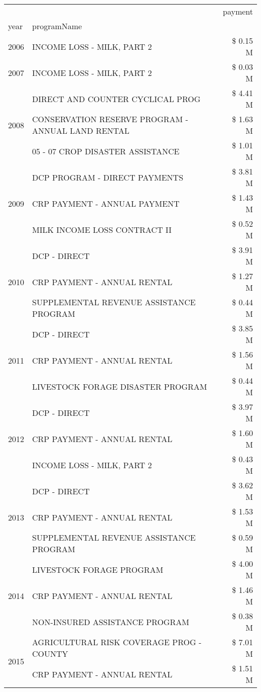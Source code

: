 \begin{tabular}{llr}
\toprule
 &  & payment \\
year & programName &  \\
\midrule
2006 & INCOME LOSS - MILK, PART 2 & \$ 0.15 M \\
\cline{1-3}
2007 & INCOME LOSS - MILK, PART 2 & \$ 0.03 M \\
\cline{1-3}
\multirow[t]{3}{*}{2008} & DIRECT AND COUNTER CYCLICAL PROG & \$ 4.41 M \\
 & CONSERVATION RESERVE PROGRAM - ANNUAL LAND RENTAL & \$ 1.63 M \\
 & 05 - 07 CROP DISASTER ASSISTANCE & \$ 1.01 M \\
\cline{1-3}
\multirow[t]{3}{*}{2009} & DCP PROGRAM - DIRECT PAYMENTS & \$ 3.81 M \\
 & CRP PAYMENT - ANNUAL PAYMENT & \$ 1.43 M \\
 & MILK INCOME LOSS CONTRACT II & \$ 0.52 M \\
\cline{1-3}
\multirow[t]{3}{*}{2010} & DCP - DIRECT & \$ 3.91 M \\
 & CRP PAYMENT - ANNUAL RENTAL & \$ 1.27 M \\
 & SUPPLEMENTAL REVENUE ASSISTANCE PROGRAM & \$ 0.44 M \\
\cline{1-3}
\multirow[t]{3}{*}{2011} & DCP - DIRECT & \$ 3.85 M \\
 & CRP PAYMENT - ANNUAL RENTAL & \$ 1.56 M \\
 & LIVESTOCK FORAGE DISASTER PROGRAM & \$ 0.44 M \\
\cline{1-3}
\multirow[t]{3}{*}{2012} & DCP - DIRECT & \$ 3.97 M \\
 & CRP PAYMENT - ANNUAL RENTAL & \$ 1.60 M \\
 & INCOME LOSS - MILK, PART 2 & \$ 0.43 M \\
\cline{1-3}
\multirow[t]{3}{*}{2013} & DCP - DIRECT & \$ 3.62 M \\
 & CRP PAYMENT - ANNUAL RENTAL & \$ 1.53 M \\
 & SUPPLEMENTAL REVENUE ASSISTANCE PROGRAM & \$ 0.59 M \\
\cline{1-3}
\multirow[t]{3}{*}{2014} & LIVESTOCK FORAGE PROGRAM & \$ 4.00 M \\
 & CRP PAYMENT - ANNUAL RENTAL & \$ 1.46 M \\
 & NON-INSURED ASSISTANCE PROGRAM & \$ 0.38 M \\
\cline{1-3}
\multirow[t]{3}{*}{2015} & AGRICULTURAL RISK COVERAGE PROG - COUNTY & \$ 7.01 M \\
 & CRP PAYMENT - ANNUAL RENTAL & \$ 1.51 M \\

\end{tabular}
